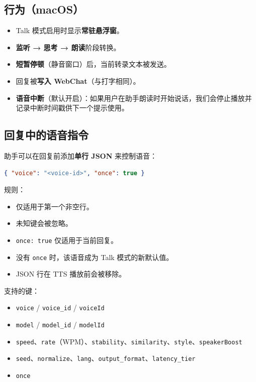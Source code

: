 \subsection{行为（macOS）}


\begin{itemize}
  \item Talk 模式启用时显示\textbf{常驻悬浮窗}。
  \item \textbf{监听 → 思考 → 朗读}阶段转换。
  \item \textbf{短暂停顿}（静音窗口）后，当前转录文本被发送。
  \item 回复被\textbf{写入 WebChat}（与打字相同）。
  \item \textbf{语音中断}（默认开启）：如果用户在助手朗读时开始说话，我们会停止播放并记录中断时间戳供下一个提示使用。
\end{itemize}


\subsection{回复中的语音指令}


助手可以在回复前添加\textbf{单行 JSON} 来控制语音：

\begin{lstlisting}[language=json]
{ "voice": "<voice-id>", "once": true }
\end{lstlisting}


规则：

\begin{itemize}
  \item 仅适用于第一个非空行。
  \item 未知键会被忽略。
  \item \texttt{once: true} 仅适用于当前回复。
  \item 没有 \texttt{once} 时，该语音成为 Talk 模式的新默认值。
  \item JSON 行在 TTS 播放前会被移除。
\end{itemize}


支持的键：

\begin{itemize}
  \item \texttt{voice} / \texttt{voice\_id} / \texttt{voiceId}
  \item \texttt{model} / \texttt{model\_id} / \texttt{modelId}
  \item \texttt{speed}、\texttt{rate}（WPM）、\texttt{stability}、\texttt{similarity}、\texttt{style}、\texttt{speakerBoost}
  \item \texttt{seed}、\texttt{normalize}、\texttt{lang}、\texttt{output\_format}、\texttt{latency\_tier}
  \item \texttt{once}
\end{itemize}


